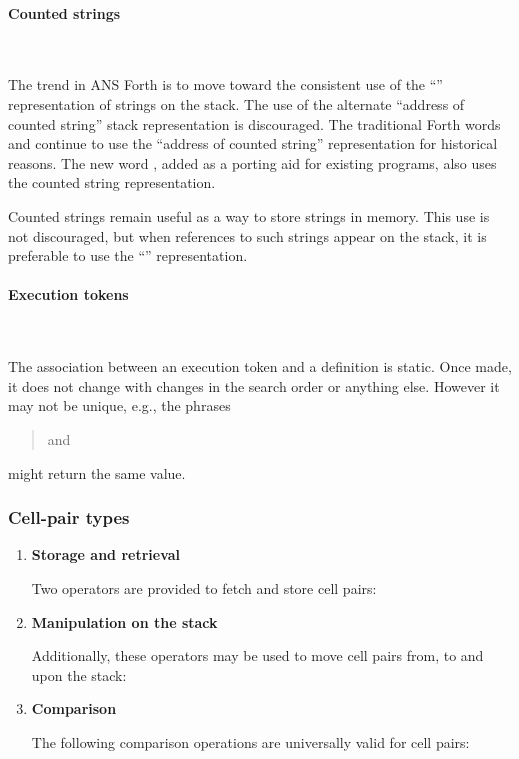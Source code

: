 \paragraph{Counted strings} ~ %
\label{rat:cstring}

The trend in ANS Forth is to move toward the consistent use of the
``'' representation of strings on the stack. The use
of the alternate ``address of counted string'' stack representation
is discouraged. The traditional Forth words  and 
continue to use the ``address of counted string'' representation for
historical reasons. The new word , added as a porting aid for
existing programs, also uses the counted string representation.

Counted strings remain useful as a way to store strings in memory.
This use is not discouraged, but when references to such strings
appear on the stack, it is preferable to use the ``''
representation.


\paragraph{Execution tokens} ~ %

The association between an execution token and a definition is static.
Once made, it does not change with changes in the search order or
anything else. However it may not be unique, e.g., the phrases
\begin{quote}\ttfamily
	  and \\
	 
\end{quote}
might return the same value.


\subsubsection{Cell-pair types} %

\begin{enumerate}
\item \textbf{Storage and retrieval}

	Two operators are provided to fetch and store cell pairs:
	\begin{quote}\ttfamily
			
	\end{quote}

\item \textbf{Manipulation on the stack}

	Additionally, these operators may be used to move cell pairs
	from, to and upon the stack:
	\begin{quote}\ttfamily
					
				
	\end{quote}

\item \textbf{Comparison}

	The following comparison operations are universally valid for
	cell pairs:
	\begin{quote}\ttfamily
			
	\end{quote}
\end{enumerate}


